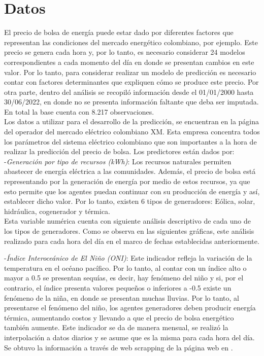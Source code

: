 \documentclass[conference, 10pt]{IEEEtran}
\begin{document}
\section{Datos} \label{AA}

El precio de bolsa de energía puede estar dado por diferentes factores que representan las condiciones del mercado energético colombiano, por ejemplo. Este precio se genera cada hora y, por lo tanto, es necesario considerar 24 modelos correspondientes a cada momento del día en donde se presentan cambios en este valor. Por lo tanto, para considerar realizar un modelo de predicción es necesario contar con factores determinantes que expliquen cómo se produce este precio. Por otra parte, dentro del análisis se recopiló información desde el 01/01/2000 hasta 30/06/2022, en donde no se presenta información faltante que deba ser imputada. En total la base cuenta con 8.217 observaciones.\\ 
Los datos a utilizar para el desarrollo de la predicción, se encuentran en la página del operador del mercado eléctrico colombiano XM. Esta empresa concentra todos los parámetros del sistema eléctrico colombiano que son importantes a la hora de realizar la predicción del precio de bolsa. Los predictores están dados por:\\
-\textit{Generación por tipo de recursos (kWh)}: Los recursos naturales permiten abastecer de energía eléctrica a las comunidades. Además, el precio de bolsa está representando por la generación de energía por medio de estos recursos, ya que esto permite que los agentes puedan continuar con su producción de energía y así, establecer dicho valor. Por lo tanto, existen 6 tipos de generadores: Eólica, solar, hidráulica, cogenerador y térmica.\\
Esta variable numérica cuenta con siguiente análisis descriptivo  de cada uno de los tipos de generadores. Como se observa en las siguientes gráficas, este análisis realizado para cada hora del día en el marco de fechas establecidas anteriormente.

-\textit{Índice Interoceánico de El Niño (ONI)}: Este indicador refleja la variación de la temperatura en el océano pacífico. Por lo tanto, al contar con un índice alto o mayor a 0.5 se presentan sequías, es decir, hay fenómeno del niño y si, por el contrario, el índice presenta valores pequeños o inferiores a -0.5 existe un fenómeno de la niña, en donde se presentan muchas lluvias. Por lo tanto, al presentarse el fenómeno del niño, los agentes generadores deben producir energía térmica, aumentando costos y llevando a que el precio de bolsa energético también aumente. Este indicador se da de manera mensual, se realizó la interpolación a datos diarios y se asume que es la misma para cada hora del día. Se obtuvo la información a través de web scrapping de la página web en \cite{b3}.\\
\end{document}
